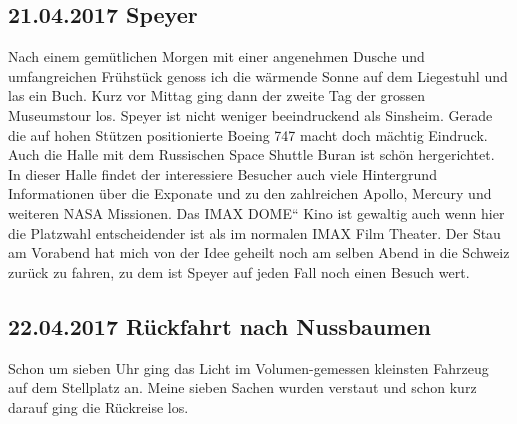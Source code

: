 \subsection{21.04.2017 Speyer }
Nach einem gemütlichen Morgen mit einer angenehmen Dusche und umfangreichen Frühstück genoss ich die wärmende Sonne auf dem Liegestuhl und las ein Buch.
Kurz vor Mittag ging dann der zweite Tag der grossen Museumstour los.
Speyer ist nicht weniger beeindruckend als Sinsheim.
Gerade die auf hohen Stützen positionierte Boeing 747 macht doch mächtig Eindruck.
Auch die Halle mit dem Russischen Space Shuttle Buran ist schön hergerichtet.
In dieser Halle findet der interessiere Besucher auch viele Hintergrund Informationen über die Exponate und zu den zahlreichen Apollo, Mercury und weiteren NASA Missionen.
Das IMAX \quotedblbase DOME\textquotedblleft{} Kino ist gewaltig auch wenn hier die Platzwahl entscheidender ist als im normalen IMAX Film Theater.
Der Stau am Vorabend hat mich von der Idee geheilt noch am selben Abend in die Schweiz zurück zu fahren, zu dem ist Speyer auf jeden Fall noch einen Besuch wert.  

\subsection{22.04.2017 Rückfahrt nach Nussbaumen }
Schon um sieben Uhr ging das Licht im Volumen-gemessen kleinsten Fahrzeug auf dem Stellplatz an.
Meine sieben Sachen wurden verstaut und schon kurz darauf ging die Rückreise los. 
